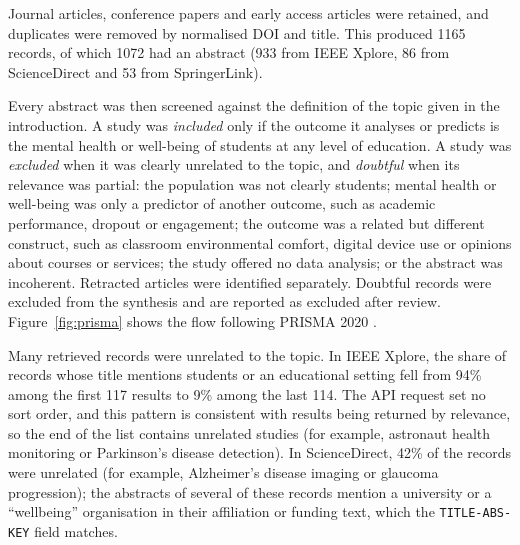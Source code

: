 \documentclass[11pt,a4paper]{article}
\begin{document}
Journal articles, conference papers and early access articles were retained, and duplicates were removed by normalised DOI and title. This produced 1165 records, of which 1072 had an abstract (933 from IEEE Xplore, 86 from ScienceDirect and 53 from SpringerLink).

Every abstract was then screened against the definition of the topic given in the introduction. A study was \emph{included} only if the outcome it analyses or predicts is the mental health or well-being of students at any level of education. A study was \emph{excluded} when it was clearly unrelated to the topic, and \emph{doubtful} when its relevance was partial: the population was not clearly students; mental health or well-being was only a predictor of another outcome, such as academic performance, dropout or engagement; the outcome was a related but different construct, such as classroom environmental comfort, digital device use or opinions about courses or services; the study offered no data analysis; or the abstract was incoherent. Retracted articles were identified separately. Doubtful records were excluded from the synthesis and are reported as excluded after review. Figure~\ref{fig:prisma} shows the flow following PRISMA 2020 \cite{page2021prisma}.

Many retrieved records were unrelated to the topic. In IEEE Xplore, the share of records whose title mentions students or an educational setting fell from 94\% among the first 117 results to 9\% among the last 114. The API request set no sort order, and this pattern is consistent with results being returned by relevance, so the end of the list contains unrelated studies (for example, astronaut health monitoring or Parkinson's disease detection). In ScienceDirect, 42\% of the records were unrelated (for example, Alzheimer's disease imaging or glaucoma progression); the abstracts of several of these records mention a university or a ``wellbeing'' organisation in their affiliation or funding text, which the \texttt{TITLE-ABS-KEY} field matches.
\end{document}
